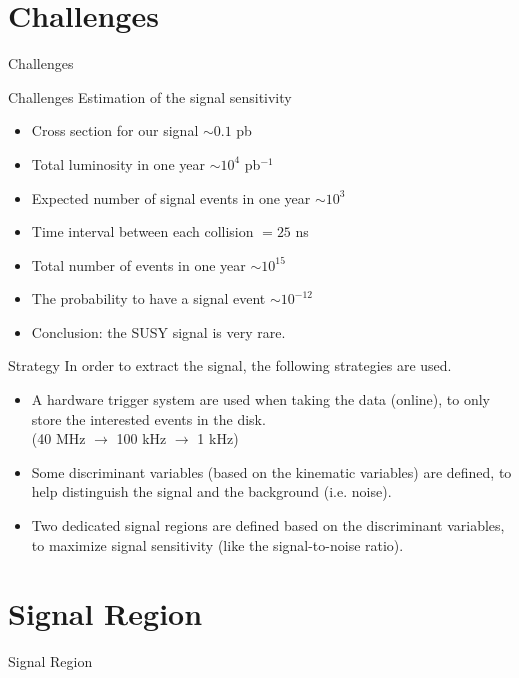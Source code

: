 \documentclass[mathserif,serif]{beamer}
\begin{document}
\section{Challenges}
\begin{frame}
\begin{center}
\huge
Challenges
\end{center}
\end{frame}

\begin{frame}{Challenges}
Estimation of the signal sensitivity
\begin{itemize}
\item Cross section for our signal $\sim 0.1$ pb
\item Total luminosity in one year $\sim 10^4$ pb$^{-1}$
\item Expected number of signal events in one year $\sim 10^3$
\end{itemize}
\begin{itemize}
\item Time interval between each collision $= 25$ ns
\item Total number of events in one year $\sim 10^{15}$
\item The probability to have a signal event $\sim 10^{-12}$
\item Conclusion: the SUSY signal is very rare.
\end{itemize}
\end{frame}

\begin{frame}{Strategy}
In order to extract the signal, the following strategies are used.
\begin{itemize}
\item A hardware trigger system are used when taking the data (online), to only store the interested events in the disk. \\
(40 MHz $\rightarrow$ 100 kHz $\rightarrow$ 1 kHz)
\item Some discriminant variables (based on the kinematic variables) are defined, to help distinguish the signal and the background (i.e. noise).
\item Two dedicated signal regions are defined based on the discriminant variables, to maximize signal sensitivity (like the signal-to-noise ratio).
\end{itemize}
\end{frame}

\section{Signal Region}
\begin{frame}
\begin{center}
\huge
Signal Region
\end{center}
\end{frame}
\end{document}
